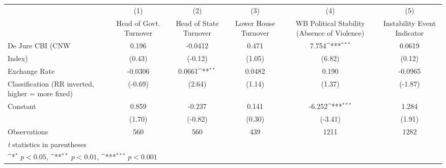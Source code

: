 {
\def\sym#1{\ifmmode^{#1}\else\(^{#1}\)\fi}
\begin{tabular}{l*{5}{c}}
\hline\hline
                    &\multicolumn{1}{c}{(1)}&\multicolumn{1}{c}{(2)}&\multicolumn{1}{c}{(3)}&\multicolumn{1}{c}{(4)}&\multicolumn{1}{c}{(5)}\\
                    &\multicolumn{1}{c}{Head of Govt. Turnover}&\multicolumn{1}{c}{Head of State Turnover}&\multicolumn{1}{c}{Lower House Turnover}&\multicolumn{1}{c}{WB Political Stability (Absence of Violence)}&\multicolumn{1}{c}{Instability Event Indicator}\\
\hline
De Jure CBI (CNW    &       0.196         &     -0.0412         &       0.471         &       7.754\sym{***}&      0.0619         \\
Index)              &      (0.43)         &     (-0.12)         &      (1.05)         &      (6.82)         &      (0.12)         \\
[1em]
Exchange Rate       &     -0.0306         &      0.0661\sym{**} &      0.0482         &       0.190         &     -0.0965         \\
Classification (RR inverted, higher = more fixed)&     (-0.69)         &      (2.64)         &      (1.14)         &      (1.37)         &     (-1.87)         \\
[1em]
Constant            &       0.859         &      -0.237         &       0.141         &      -6.252\sym{***}&       1.284         \\
                    &      (1.70)         &     (-0.82)         &      (0.30)         &     (-3.41)         &      (1.91)         \\
\hline
Observations        &         560         &         560         &         439         &        1211         &        1282         \\
\hline\hline
\multicolumn{6}{l}{\footnotesize \textit{t} statistics in parentheses}\\
\multicolumn{6}{l}{\footnotesize \sym{*} \(p<0.05\), \sym{**} \(p<0.01\), \sym{***} \(p<0.001\)}\\
\end{tabular}
}
